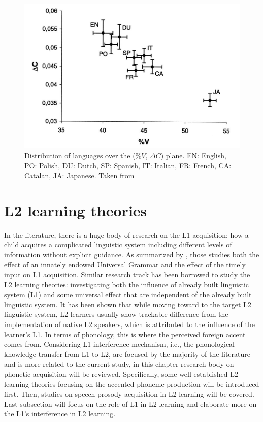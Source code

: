 \begin{figure}
\centering
\captionsetup{justification=centering}
\includegraphics[width = 0.8\linewidth]{figures/ramus_paper.JPG}
\caption{Distribution of languages over the ($\%V$, $\Delta C$) plane. EN: English, PO: Polish, DU: Dutch, SP: Spanish, IT: Italian, FR: French, CA: Catalan, JA: Japanese. Taken from \citep{ramus1999correlates}}
\label{fig:rhythm_lang}
\end{figure}

\section{L2 learning theories}

In the literature, there is a huge body of research on the L1 acquisition: how a child acquires a complicated linguistic system including different levels of information without explicit guidance. As summarized by \cite{chang2010first}, those studies both the effect of an innately endowed Universal Grammar and the effect of the timely input on L1 acquisition. Similar research track has been borrowed to study the L2 learning theories: investigating both the influence of already built linguistic system (L1) and some universal effect that are independent of the already built linguistic system. It has been shown that while moving toward to the target L2 linguistic system, L2 learners usually show trackable difference from the implementation of native L2 speakers, which is attributed to the influence of the learner's L1. In terms of phonology, this is where the perceived foreign accent comes from. Considering L1 interference mechanism, i.e., the phonological knowledge transfer from L1 to L2, are focused by the majority of the literature and is more related to the current study, in this chapter research body on phonetic acquisition will be reviewed. Specifically, some well-established L2 learning theories focusing on the accented phoneme production will be introduced first. Then, studies on speech prosody acquisition in L2 learning will be covered. Last subsection will focus on the role of L1 in L2 learning and elaborate more on the L1's interference in L2 learning.

